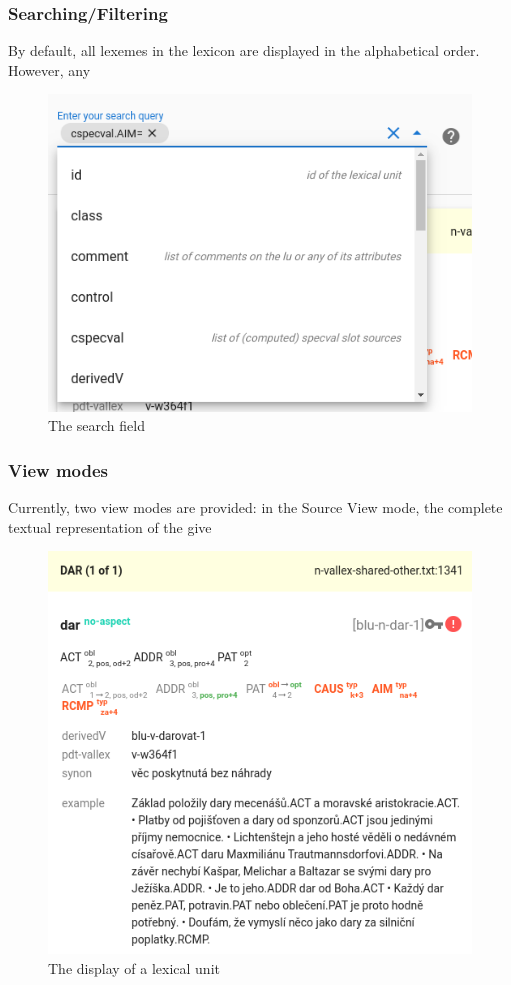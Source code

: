 \documentclass[10pt, a4paper]{article}
\begin{document}
\subsubsection{Searching/Filtering}
By default, all lexemes in the lexicon are displayed in the alphabetical order.
However, any 
\begin{figure}
    \includegraphics[width=\hsize]{images/ui-search.png}
    \caption{\label{fig:ui-search}The search field}
\end{figure}

\subsubsection{View modes}
Currently, two view modes are provided:
in the Source View mode, the complete textual representation of the give

\begin{figure}
    \includegraphics[width=\hsize]{images/ui-lexical-unit.png}
    \caption{\label{fig:ui-lexical-unit}The display of a lexical unit}
\end{figure}
\end{document}
